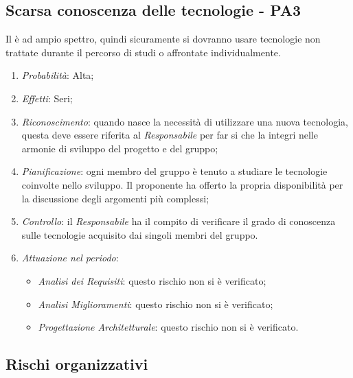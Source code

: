\subsection{Scarsa conoscenza delle tecnologie - PA3}
Il  \`e ad ampio spettro, quindi sicuramente si dovranno usare tecnologie non trattate durante il percorso di studi o affrontate individualmente.
\begin{enumerate}
\item \textit{Probabilit\`a}: Alta;
\item \textit{Effetti}: Seri;
\item \textit{Riconoscimento}: quando nasce la necessità di utilizzare una nuova tecnologia, questa deve essere riferita al \textit{Responsabile} per far si che la integri nelle armonie di sviluppo del progetto e del gruppo;
\item \textit{Pianificazione}: ogni membro del gruppo \`e tenuto a studiare le tecnologie coinvolte nello sviluppo. Il proponente ha offerto la propria disponibilit\`a per la discussione degli argomenti pi\`u complessi;
\item \textit{Controllo}: il \textit{Responsabile} ha il compito di verificare il grado di conoscenza sulle tecnologie acquisito dai singoli membri del gruppo.
\item \textit{Attuazione nel periodo}: 
	\begin{itemize}
	\item \textit{Analisi dei Requisiti}: questo rischio non si è verificato;
	\item \textit{Analisi Miglioramenti}: questo rischio non si è verificato;
	\item \textit{Progettazione Architetturale}: questo rischio non si è verificato.
	\end{itemize}
\end{enumerate}

\subsection{Rischi organizzativi}
